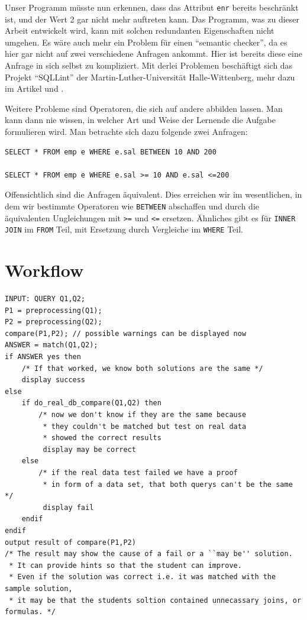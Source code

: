 Unser Programm müsste nun erkennen, dass das Attribut \verb|enr| bereits beschränkt ist, und der Wert 2 gar nicht mehr auftreten kann. Das Programm, was zu dieser Arbeit entwickelt wird, kann mit solchen redundanten Eigenschaften nicht umgehen. Es wäre auch mehr ein Problem für einen ``semantic checker'', da es hier gar nicht auf zwei verschiedene Anfragen ankommt. Hier ist bereits diese eine Anfrage in sich selbst zu kompliziert. Mit derlei Problemen beschäftigt sich das Projekt ``SQLLint'' der Martin-Luther-Universität Halle-Wittenberg, mehr dazu im Artikel \cite{brass1} und \cite{brass2}.

Weitere Probleme sind Operatoren, die sich auf andere abbilden lassen. Man kann dann nie wissen, in welcher Art und Weise der Lernende die Aufgabe formulieren wird. Man betrachte sich dazu folgende zwei Anfragen:
\begin{verbatim}
SELECT * FROM emp e WHERE e.sal BETWEEN 10 AND 200

SELECT * FROM emp e WHERE e.sal >= 10 AND e.sal <=200
\end{verbatim}

Offensichtlich sind die Anfragen äquivalent. Dies erreichen wir im wesentlichen, in dem wir bestimmte Operatoren wie \verb|BETWEEN| abschaffen und durch die äquivalenten Ungleichungen mit \verb|>=| und \verb|<=| ersetzen. Ähnliches gibt es für \verb|INNER JOIN| im \verb|FROM| Teil, mit Ersetzung durch Vergleiche im \verb|WHERE| Teil. 

\section{Workflow}

\begin{verbatim}
INPUT: QUERY Q1,Q2;
P1 = preprocessing(Q1);
P2 = preprocessing(Q2);
compare(P1,P2); // possible warnings can be displayed now
ANSWER = match(Q1,Q2);
if ANSWER yes then
    /* If that worked, we know both solutions are the same */
    display success
else 
    if do_real_db_compare(Q1,Q2) then
        /* now we don't know if they are the same because
         * they couldn't be matched but test on real data 
         * showed the correct results 
         display may be correct
    else 
        /* if the real data test failed we have a proof 
         * in form of a data set, that both querys can't be the same */
         display fail
    endif
endif
output result of compare(P1,P2)
/* The result may show the cause of a fail or a ``may be'' solution. 
 * It can provide hints so that the student can improve.
 * Even if the solution was correct i.e. it was matched with the sample solution, 
 * it may be that the students soltion contained unnecassary joins, or formulas. */
\end{verbatim}

